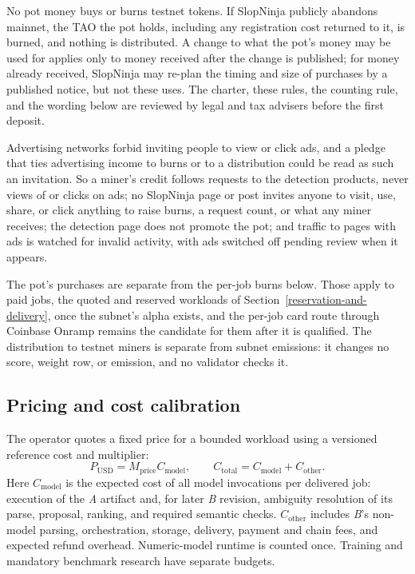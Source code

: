 No pot money buys or burns testnet tokens. If SlopNinja publicly abandons
mainnet, the TAO the pot holds, including any registration cost returned to
it, is burned, and nothing is distributed. A change to what the pot's money
may be used for applies only to money received after the change is published;
for money already received, SlopNinja may re-plan the timing and size of
purchases by a published notice, but not these uses. The
charter, these rules, the counting rule, and the wording below are reviewed
by legal and tax advisers before the first deposit.

Advertising networks forbid inviting people to view or click ads, and a pledge
that ties advertising income to burns or to a distribution could be read as
such an invitation. So a miner's credit follows requests to the detection
products, never views of or clicks on ads; no SlopNinja page or post invites
anyone to visit, use, share, or click anything to raise burns, a request
count, or what any miner receives; the detection page does not promote the
pot; and traffic to pages with ads is watched for invalid activity, with ads
switched off pending review when it appears.

The pot's purchases are separate from the per-job burns below. Those apply to
paid jobs, the quoted and reserved workloads of
Section~\ref{reservation-and-delivery}, once the subnet's alpha exists, and
the per-job card route through Coinbase Onramp remains the candidate for them
after it is qualified. The distribution to testnet miners is separate from
subnet emissions: it changes no score, weight row, or emission, and no
validator checks it.

\subsection{Pricing and cost calibration}\label{market-pricing-in-alpha}

The operator quotes a fixed price for a bounded workload using a versioned
reference cost and multiplier:
\[
  P_{\mathrm{USD}} = M_{\mathrm{price}} C_{\mathrm{model}},\qquad
  C_{\mathrm{total}} = C_{\mathrm{model}} + C_{\mathrm{other}}.
\]
Here \(C_{\mathrm{model}}\) is the expected cost of all model invocations per
delivered job: execution of the \textit{A} artifact and, for later \textit{B}
revision, ambiguity resolution of its parse, proposal, ranking, and required
semantic checks.
\(C_{\mathrm{other}}\) includes \textit{B}'s non-model parsing, orchestration, storage,
delivery, payment and chain fees, and expected refund overhead. Numeric-model
runtime is counted once. Training and mandatory benchmark research have
separate budgets.

